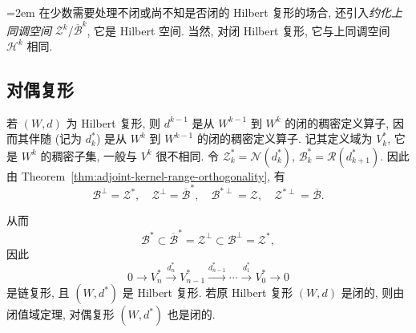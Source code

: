{\emergencystretch=2em
在少数需要处理不闭或尚不知是否闭的 Hilbert 复形的场合, 还引入\emph{约化上同调空间} $\mathcal Z^k/\overline{\mathcal B}^k$, 它是 Hilbert 空间. 当然, 对闭 Hilbert 复形, 它与上同调空间 $\mathcal H^k$ 相同.

\par}
\subsection{对偶复形}\label{subsec:dual-hilbert-complex}

若 $(W,d)$ 为 Hilbert 复形, 则 $d^{k-1}$ 是从 $W^{k-1}$ 到 $W^k$ 的闭的稠密定义算子, 因而其伴随 (记为 $d_k^*$) 是从 $W^k$ 到 $W^{k-1}$ 的闭的稠密定义算子. 记其定义域为 $V_k^*$, 它是 $W^k$ 的稠密子集, 一般与 $V^k$ 很不相同. 令 $\mathcal Z_k^*=\mathcal N(d_k^*)$, $\mathcal B_k^*=\mathcal R(d_{k+1}^*)$. 因此由 Theorem~\ref{thm:adjoint-kernel-range-orthogonality}, 有
\[
\mathcal B^\perp=\mathcal Z^*,\quad\mathcal Z^\perp=\overline{\mathcal B}^*,\quad\mathcal B^{*\perp}=\mathcal Z,\quad\mathcal Z^{*\perp}=\overline{\mathcal B}.
\]

从而
\[
\mathcal B^*\subset\overline{\mathcal B}^*=\mathcal Z^\perp\subset\mathcal B^\perp=\mathcal Z^*,
\]
因此
\[
0\to V_n^*\xrightarrow{d_n^*}V_{n-1}^*\xrightarrow{d_{n-1}^*}\cdots\xrightarrow{d_1^*}V_0^*\to0
\]
是链复形, 且 $(W,d^*)$ 是 Hilbert 复形. 若原 Hilbert 复形 $(W,d)$ 是闭的, 则由闭值域定理, 对偶复形 $(W,d^*)$ 也是闭的.
